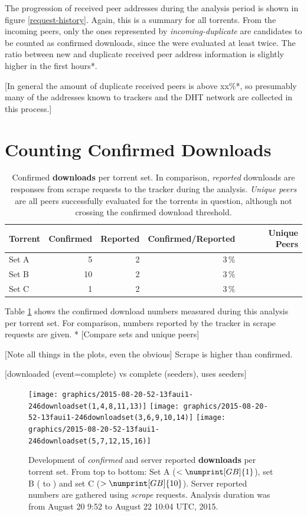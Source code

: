 \documentclass[10pt, a4paper, twoside, headsepline]{scrbook}
\renewcommand{\_}{\origunderscore\allowbreak}
\newcommand{\range}{from August 20 9:52 to August 22 10:04 UTC, 2015} %
\begin{document}
The progression of received peer addresses during the analysis period is shown in figure \ref{request-history}. Again, this is a summary for all torrents. From the incoming peers, only the ones represented by \emph{incoming-duplicate} are candidates to be counted as confirmed downloads, since the were evaluated at least twice. The ratio between new and duplicate received peer address information is slightly higher in the first hours*.

[In general the amount of duplicate received peers is above xx\%*, so presumably many of the addresses known to trackers and the DHT network are collected in this process.]

\section{Counting Confirmed Downloads}
\begin{table}
\centering
\begin{tabular}{lrrrr}
\toprule
Torrent & Confirmed & Reported & Confirmed/Reported & Unique Peers \\
\midrule
Set A & 5 & 2 & 3\,\% \\
Set B & 10 & 2 & 3\,\% \\
Set C & 1 & 2 & 3\,\% \\
\bottomrule
\end{tabular}
\caption[Confirmed downloads per torrent set]{Confirmed \textbf{downloads} per torrent set. In comparison, \emph{reported} downloads are responses from scrape requests to the tracker during the analysis. \emph{Unique peers} are all peers successfully evaluated for the torrents in question, although not crossing the confirmed download threshold.}
\label{confirmed-downloads}
\end{table}

Table \ref{confirmed-downloads} shows the confirmed download numbers measured during this analysis per torrent set. For comparison, numbers reported by the tracker in scrape requests are given. * [Compare sets and unique peers]

[Note all things in the plots, even the obvious] Scrape is higher than confirmed.

[downloaded (event=complete) vs complete (seeders), \cite{watters2011much} uses seeders]

\begin{figure}
\centering
\texttt{[image: graphics/2015-08-20\_11-52-13\_faui1-246\_download\_set\_(1,4,8,11,13)]}
\texttt{[image: graphics/2015-08-20\_11-52-13\_faui1-246\_download\_set\_(3,6,9,10,14)]}
\texttt{[image: graphics/2015-08-20\_11-52-13\_faui1-246\_download\_set\_(5,7,12,15,16)]}
\caption[Development of confirmed and reported downloads per torrent set]{Development of \emph{confirmed} and server reported \textbf{downloads} per torrent set. From top to bottom: Set A ($<\numprint[GB]{1}$), set B ( to ) and set C ($>\numprint[GB]{10}$). Server reported numbers are gathered using \emph{scrape} requests. Analysis duration was \range.}
\label{download-history}
\end{figure}
\end{document}
